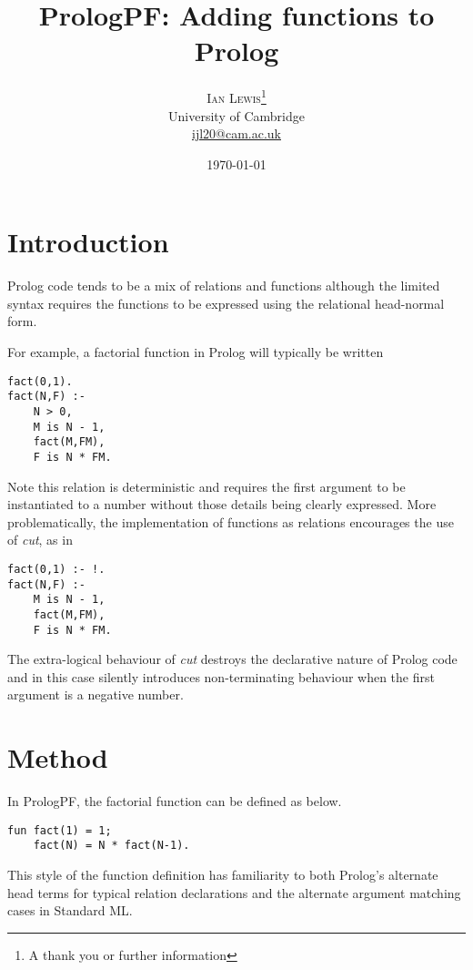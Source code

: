\documentclass[twoside,twocolumn]{article}
\title{PrologPF: Adding functions to Prolog}                %
\author{%
\textsc{Ian Lewis}\thanks{A thank you or further information} \\[1ex] %
\normalsize University of Cambridge \\                      %
\normalsize \href{mailto:ijl20@cam.ac.uk}{ijl20@cam.ac.uk}  %
}
\date{\today}                                               %
\begin{document}
\maketitle


\section{Introduction}

Prolog code tends to be a mix of relations and functions although the limited
syntax requires the functions to be expressed using the relational head-normal form.

For example, a factorial function in Prolog will typically be written

\begin{verbatim}
fact(0,1).
fact(N,F) :-
    N > 0,
    M is N - 1,
    fact(M,FM),
    F is N * FM.
\end{verbatim}

Note this relation is deterministic and requires the first argument to be instantiated
to a number without those details being clearly expressed. More problematically, the
implementation of functions as relations encourages the use of \textit{cut}, as in

\begin{verbatim}
fact(0,1) :- !.
fact(N,F) :-
    M is N - 1,
    fact(M,FM),
    F is N * FM.
\end{verbatim}

The extra-logical behaviour of \textit{cut} destroys the declarative nature of Prolog
code and in this case silently introduces non-terminating behaviour when the first
argument is a negative number.

\section{Method}

In PrologPF, the factorial function can be defined as below.
\begin{verbatim}
fun fact(1) = 1;
    fact(N) = N * fact(N-1).
\end{verbatim}

This style of the function definition has familiarity to both Prolog's alternate head terms
for typical relation declarations and the alternate argument matching cases in Standard ML.
\end{document}
